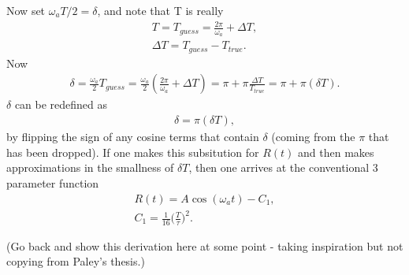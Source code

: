 Now set $\omega_{a}T/2 = \delta$, and note that T is really
	\begin{equation}
	\begin{aligned}
 		T = T_{guess} = \frac{2\pi}{\omega_{a}} + \Delta T, \\
 		\Delta T = T_{guess} - T_{true}.
	\end{aligned}
	\end{equation}
Now 
	\begin{align}
		\delta = \frac{\omega_{a}}{2} T_{guess} = \frac{\omega_{a}}{2} (\frac{2\pi}{\omega_{a}} + \Delta T) = \pi + \pi \frac{\Delta T}{T_{true}} = \pi + \pi (\delta T).
	\end{align}
$\delta$ can be redefined as 
	\begin{align}
		\delta = \pi (\delta T),
	\end{align}
by flipping the sign of any cosine terms that contain $\delta$ (coming from the $\pi$ that has been dropped). If one makes this subsitution for $R(t)$ and then makes approximations in the smallness of $\delta T$, then one arrives at the conventional 3 parameter function
	\begin{align}
		R(t) = A \cos(\omega_{a}t) - C_{1}, \\
		C_{1} = \frac{1}{16} \Big(\frac{T}{\tau}\Big)^{2}.
	\end{align}
	
(Go back and show this derivation here at some point - taking inspiration but not copying from Paley's thesis.)


